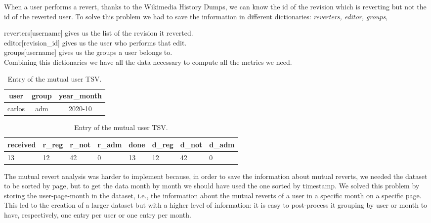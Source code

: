 When a user performs a revert, thanks to the Wikimedia History Dumps, we can know the id of the
revision which is reverting but not the id of the reverted user. To solve this problem we
had to save the information in different dictionaries: \textit{reverters, editor, groups}, 
\bigskip

reverters[username] gives us the list of the revision it reverted. \\
\indent editor[revision\_id] gives us the user who performs that edit. \\
\indent groups[username] gives us the groups a user belongs to.\\

Combining this dictionaries we have all the data necessary to compute all the metrics we need.
\begin{table}[H]
    \centering
    \begin{tabularx}{\columnwidth}{@{}ccc@{}}
        \midrule
        \textbf{user} & \textbf{group} & \textbf{year\_month} \\ \toprule
        carlos & adm & 2020-10  \\
        
         \bottomrule
    \end{tabularx}
    \begin{tabularx}{\columnwidth}{@{}XXXXXXXX@{}}
        \midrule
        \textbf{received} & \textbf{r\_reg}  & \textbf{r\_not} & \textbf{r\_adm} & \textbf{done} & \textbf{d\_reg} & \textbf{d\_not} & \textbf{d\_adm}\\ \toprule
        13 & 12 & 42  & 0 & 13 & 12 & 42  & 0  \\
        
         \bottomrule
    \end{tabularx}
    
    \caption{Entry of the mutual user TSV. \label{table:revks}}
\end{table}


The mutual revert analysis was harder to implement because, in order to save the information about
mutual reverts, we needed the dataset to be sorted by page, but to get the data month by month we should have used the
one sorted by timestamp. We solved this problem by storing the user-page-month in the dataset, i.e.,
the information about the mutual reverts of a user in a specific month on a specific page.
This led to the creation of a larger dataset but with a higher level of information: it is easy to post-process it
grouping by user or month to have, respectively, one entry per user or one entry per month. 


